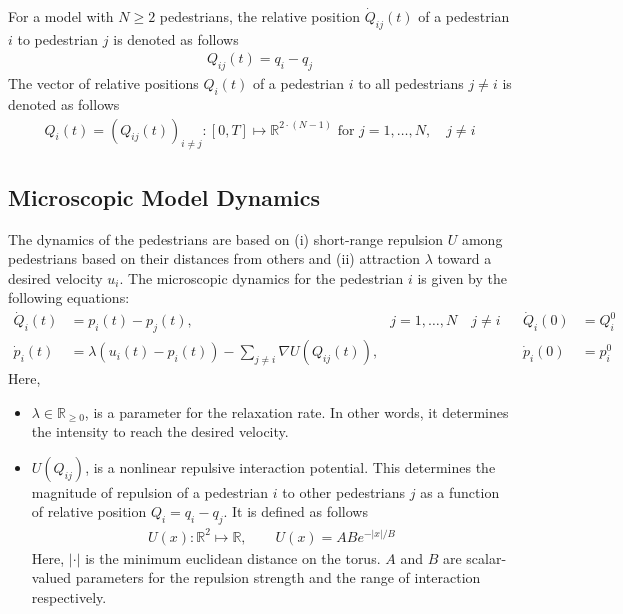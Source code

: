For a model with $N \geq 2$ pedestrians, the relative position $\dot Q_{ij}(t)$ of a pedestrian $i$ to pedestrian $j$ is denoted as follows
\begin{align*}
    {Q}_{ij}(t) = q_i - q_j
\end{align*}
The vector of relative positions $Q_i(t)$ of a pedestrian $i$ to all pedestrians $j \neq i$ is denoted as follows
\begin{align*}
    {Q}_{i}(t) = ({Q}_{ij}(t))_{i\neq j} : [0,T] \mapsto \mathbb{R}^{2\cdot(N-1)} \text{ for } j = 1,\dots, N, \quad j \neq i
\end{align*}


\subsection{Microscopic Model Dynamics}
\label{section:micro_model_dynamics}
The dynamics of the pedestrians are based on (i) short-range repulsion $U$ among pedestrians based on their distances from others and (ii) attraction $\lambda$ toward a desired velocity $u_i$. The microscopic dynamics for the pedestrian $i$ is given by the following equations:
\begin{equation}
\begin{aligned}
    \dot Q_{i}(t) &= p_i(t) - p_j(t), &j = 1,\dots,N \quad j \neq i& & \dot Q_i(0) &= Q^0_i \\
    \dot p_i(t) &= \lambda(u_i(t) - p_i(t)) - \sum_{j \neq i} \nabla U (Q_{ij}(t)), && & \dot p_i(0) &= p^0_i
\end{aligned}
\label{eq:micro}
\end{equation}
Here,
\begin{itemize}
    \item $\lambda \in \mathbb{R}_{\geq 0}$, is a parameter for the relaxation rate. In other words, it determines the intensity to reach the desired velocity. 
    \item $U(Q_{ij})$, is a nonlinear repulsive interaction potential. This determines the magnitude of repulsion of a pedestrian $i$ to other pedestrians $j$ as a function of relative position $Q_i = q_i - q_j$. It is defined as follows 
    \begin{align} 
        U(x) : \mathbb{R}^2 \mapsto \mathbb{R}, \quad\quad U(x) = ABe^{-|x|/B}
        \label{eq:def_potU}
    \end{align}
    Here, $|\cdot|$ is the minimum euclidean distance on the torus. $A$ and $B$ are scalar-valued parameters for the repulsion strength and the range of interaction respectively.
\end{itemize}

